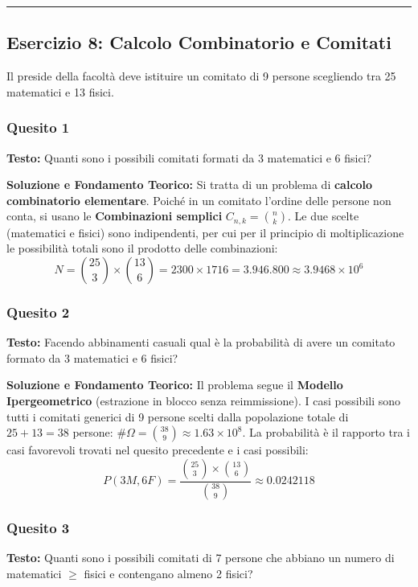 \documentclass[12pt, a4paper]{article}
\begin{document}
\vspace{0.5cm}\hrule\vspace{0.5cm}

\subsection*{Esercizio 8: Calcolo Combinatorio e Comitati}
Il preside della facoltà deve istituire un comitato di 9 persone scegliendo tra 25 matematici e 13 fisici.

\subsubsection*{Quesito 1}
\textbf{Testo:} Quanti sono i possibili comitati formati da 3 matematici e 6 fisici?

\textbf{Soluzione e Fondamento Teorico:} 
Si tratta di un problema di \textbf{calcolo combinatorio elementare}. Poiché in un comitato l'ordine delle persone non conta, si usano le \textbf{Combinazioni semplici} $C_{n,k} = \binom{n}{k}$. 
Le due scelte (matematici e fisici) sono indipendenti, per cui per il principio di moltiplicazione le possibilità totali sono il prodotto delle combinazioni:
$$ N = \binom{25}{3} \times \binom{13}{6} = 2300 \times 1716 = 3.946.800 \approx 3.9468 \times 10^6 $$

\subsubsection*{Quesito 2}
\textbf{Testo:} Facendo abbinamenti casuali qual è la probabilità di avere un comitato formato da 3 matematici e 6 fisici?

\textbf{Soluzione e Fondamento Teorico:} 
Il problema segue il \textbf{Modello Ipergeometrico} (estrazione in blocco senza reimmissione).
I casi possibili sono tutti i comitati generici di 9 persone scelti dalla popolazione totale di $25 + 13 = 38$ persone: $\#\Omega = \binom{38}{9} \approx 1.63 \times 10^8$.
La probabilità è il rapporto tra i casi favorevoli trovati nel quesito precedente e i casi possibili:
$$ P(3M, 6F) = \frac{\binom{25}{3} \times \binom{13}{6}}{\binom{38}{9}} \approx 0.0242118 $$

\subsubsection*{Quesito 3}
\textbf{Testo:} Quanti sono i possibili comitati di 7 persone che abbiano un numero di matematici $\ge$ fisici e contengano almeno 2 fisici?
\end{document}
